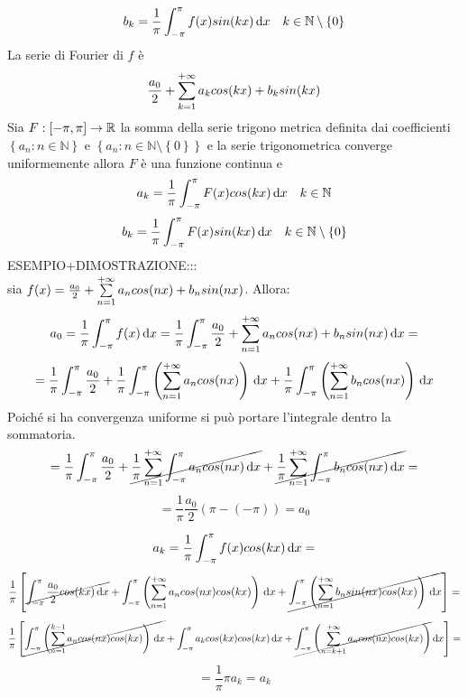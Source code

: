 $$b_k=\frac{1}{\pi}\int_{-\pi}^{\pi}f(x)sin(kx)\,\mathrm{d}{x}\quad k\in\mathbb{N}\setminus{\left\{0\right\}}$$
La serie di Fourier di $f$ è
$$\frac{a_0}{2}+\sum\limits_{k=1}^{+\infty}a_{k}cos(kx)+b_{k}sin(kx)$$
\proposition
Sia $F:\left[-\pi,\pi\right]\to \mathbb{R}$ la somma della serie trigono metrica definita dai coefficienti $\left\{a_n:n\in\mathbb{N}\right\}$ e $\left\{a_n:n\in\mathbb{N}\setminus{\left\{0\right\}}\right\}$ e la serie trigonometrica converge uniformemente allora $F$ è una funzione continua e 
$$a_k=\frac{1}{\pi}\int_{-\pi}^{\pi}F(x)cos(kx)\,\mathrm{d}{x}\quad k\in\mathbb{N}$$
$$b_k=\frac{1}{\pi}\int_{-\pi}^{\pi}F(x)sin(kx)\,\mathrm{d}{x}\quad k\in\mathbb{N}\setminus{\left\{0\right\}}$$
ESEMPIO+DIMOSTRAZIONE:::\\
sia $f(x)=\frac{a_0}{2}+\sum\limits_{n=1}^{+\infty}a_{n}cos(nx)+b_{n}sin(nx)$. Allora:\\
$$a_0=\frac{1}{\pi}\int_{-\pi}^{\pi}f(x)\,\mathrm{d}{x}=\frac{1}{\pi}\int_{-\pi}^{\pi}\frac{a_0}{2}+\sum\limits_{n=1}^{+\infty}a_{n}cos(nx)+b_{n}sin(nx)\,\mathrm{d}{x}=$$
$$ 
= \frac{1}{\pi}\int_{-\pi}^{\pi}\frac{a_0}{2} +
\frac{1}{\pi}\int_{-\pi}^{\pi}\left(\sum\limits_{n=1}^{+\infty} a_ncos(nx)\right)\,\mathrm{d}{x} + 
\frac{1}{\pi}\int_{-\pi}^{\pi}\left(\sum\limits_{n=1}^{+\infty} b_ncos(nx)\right)\,\mathrm{d}{x}
$$
Poiché si ha convergenza uniforme si può portare l'integrale dentro la sommatoria.
$$ 
= \frac{1}{\pi}\int_{-\pi}^{\pi}\frac{a_0}{2} +
\cancel{\frac{1}{\pi}\sum\limits_{n=1}^{+\infty}\int_{-\pi}^{\pi} a_ncos(nx)\,\mathrm{d}{x}} + 
\cancel{\frac{1}{\pi}\sum\limits_{n=1}^{+\infty}\int_{-\pi}^{\pi} b_ncos(nx)\,\mathrm{d}{x}}=
$$
$$=\frac{1}{\pi}\frac{a_0}{2}\left(\pi-(-\pi)\right)=a_0$$


$$a_k=\frac{1}{\pi}\int_{-\pi}^{\pi}f(x)cos(kx)\,\mathrm{d}{x}=$$
$$\frac{1}{\pi}\left[
\cancel{\int_{-\pi}^{\pi}\frac{a_0}{2}cos(kx)\,\mathrm{d}{x}}+
\int_{-\pi}^{\pi}\left(\sum\limits_{n=1}^{+\infty}a_ncos(nx)cos(kx)\right)\,\mathrm{d}{x}+
\cancel{\int_{-\pi}^{\pi}\left(\sum\limits_{n=1}^{+\infty}b_nsin(nx)cos(kx)\right)\,\mathrm{d}{x}}
\right]=$$
$$\frac{1}{\pi}\left[
\cancel{\int_{-\pi}^{\pi}\left(\sum\limits_{n=1}^{k-1} a_ncos(nx)cos(kx)\right)\,\mathrm{d}{x}}+
\int_{-\pi}^{\pi}a_kcos(kx)cos(kx)\,\mathrm{d}{x}+
\cancel{\int_{-\pi}^{\pi}\left(\sum\limits_{n=k+1}^{+\infty}a_ncos(nx)cos(kx)\right)}\,\mathrm{d}{x}
\right]=$$
$$=\frac{1}{\pi}\pi a_k=a_k$$

